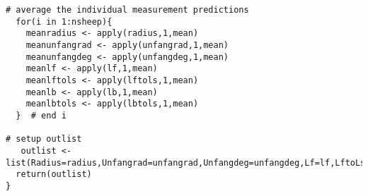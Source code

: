 \documentclass[titlepage,10pt]{article}  %
\begin{document}
\begin{verbatim}
# average the individual measurement predictions
  for(i in 1:nsheep){
    meanradius <- apply(radius,1,mean)
    meanunfangrad <- apply(unfangrad,1,mean)
    meanunfangdeg <- apply(unfangdeg,1,mean)
    meanlf <- apply(lf,1,mean)
    meanlftols <- apply(lftols,1,mean)
    meanlb <- apply(lb,1,mean)
    meanlbtols <- apply(lbtols,1,mean)
  }  # end i

# setup outlist
   outlist <- list(Radius=radius,Unfangrad=unfangrad,Unfangdeg=unfangdeg,Lf=lf,LftoLs=lftols,Lb=lb,LbtoLs=lbtols,MeanRadius=meanradius,MeanUnfangrad=meanunfangrad,MeanUnfangdeg=meanunfangdeg,MeanLf=meanlf,MeanLftoLs=meanlftols,MeanLb=meanlb,MeanLbtoLs=meanlbtols,Lambda=lambda,Ampl=ampl,CrimpType=type,Stalen=stalen,Twistlen=twistlen,Twistrad=twistrad)
  return(outlist)
}
\end{verbatim}
\end{document}
